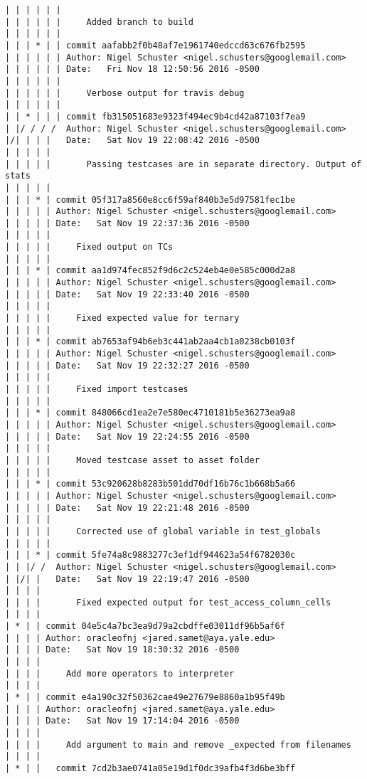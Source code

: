 \begin{lstlisting}
| | | | | | 
| | | | | |     Added branch to build
| | | | | |       
| | | * | | commit aafabb2f0b48af7e1961740edccd63c676fb2595
| | | | | | Author: Nigel Schuster <nigel.schusters@googlemail.com>
| | | | | | Date:   Fri Nov 18 12:50:56 2016 -0500
| | | | | | 
| | | | | |     Verbose output for travis debug
| | | | | |       
| | * | | | commit fb315051683e9323f494ec9b4cd42a87103f7ea9
| |/ / / /  Author: Nigel Schuster <nigel.schusters@googlemail.com>
|/| | | |   Date:   Sat Nov 19 22:08:42 2016 -0500
| | | | |   
| | | | |       Passing testcases are in separate directory. Output of stats
| | | | |      
| | | * | commit 05f317a8560e8cc6f59af840b3e5d97581fec1be
| | | | | Author: Nigel Schuster <nigel.schusters@googlemail.com>
| | | | | Date:   Sat Nov 19 22:37:36 2016 -0500
| | | | | 
| | | | |     Fixed output on TCs
| | | | |      
| | | * | commit aa1d974fec852f9d6c2c524eb4e0e585c000d2a8
| | | | | Author: Nigel Schuster <nigel.schusters@googlemail.com>
| | | | | Date:   Sat Nov 19 22:33:40 2016 -0500
| | | | | 
| | | | |     Fixed expected value for ternary
| | | | |      
| | | * | commit ab7653af94b6eb3c441ab2aa4cb1a0238cb0103f
| | | | | Author: Nigel Schuster <nigel.schusters@googlemail.com>
| | | | | Date:   Sat Nov 19 22:32:27 2016 -0500
| | | | | 
| | | | |     Fixed import testcases
| | | | |      
| | | * | commit 848066cd1ea2e7e580ec4710181b5e36273ea9a8
| | | | | Author: Nigel Schuster <nigel.schusters@googlemail.com>
| | | | | Date:   Sat Nov 19 22:24:55 2016 -0500
| | | | | 
| | | | |     Moved testcase asset to asset folder
| | | | |      
| | | * | commit 53c920628b8283b501dd70df16b76c1b668b5a66
| | | | | Author: Nigel Schuster <nigel.schusters@googlemail.com>
| | | | | Date:   Sat Nov 19 22:21:48 2016 -0500
| | | | | 
| | | | |     Corrected use of global variable in test_globals
| | | | |      
| | | * | commit 5fe74a8c9883277c3ef1df944623a54f6782030c
| | |/ /  Author: Nigel Schuster <nigel.schusters@googlemail.com>
| |/| |   Date:   Sat Nov 19 22:19:47 2016 -0500
| | | |   
| | | |       Fixed expected output for test_access_column_cells
| | | |     
| * | | commit 04e5c4a7bc3ea9d79a2cbdffe03011df96b5af6f
| | | | Author: oracleofnj <jared.samet@aya.yale.edu>
| | | | Date:   Sat Nov 19 18:30:32 2016 -0500
| | | | 
| | | |     Add more operators to interpreter
| | | |     
| * | | commit e4a190c32f50362cae49e27679e8860a1b95f49b
| | | | Author: oracleofnj <jared.samet@aya.yale.edu>
| | | | Date:   Sat Nov 19 17:14:04 2016 -0500
| | | | 
| | | |     Add argument to main and remove _expected from filenames
| | | |       
| * | |   commit 7cd2b3ae0741a05e19d1f0dc39afb4f3d6be3bff

\end{lstlisting}
